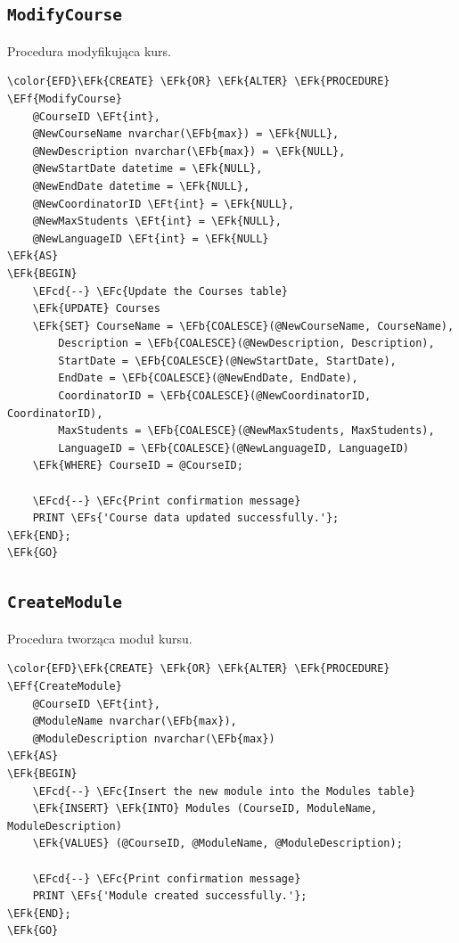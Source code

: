 \documentclass[11pt]{article}
\newcommand{\EFc}[1]{\textcolor{EFc}{\textit{#1}}} %
\newcommand{\EFcd}[1]{\textcolor{EFcd}{\textit{#1}}} %
\newcommand{\EFs}[1]{\textcolor{EFs}{#1}} %
\newcommand{\EFk}[1]{\textcolor{EFk}{\textbf{#1}}} %
\newcommand{\EFb}[1]{\textcolor{EFb}{\textbf{#1}}} %
\newcommand{\EFf}[1]{\textcolor{EFf}{#1}} %
\newcommand{\EFt}[1]{\textcolor{EFt}{\textbf{#1}}} %
\begin{document}
\subsection{\texttt{ModifyCourse}}
\label{sec:orgd56f8fb}
Procedura modyfikująca kurs.
\begin{Code}
\begin{Verbatim}
\color{EFD}\EFk{CREATE} \EFk{OR} \EFk{ALTER} \EFk{PROCEDURE} \EFf{ModifyCourse}
    @CourseID \EFt{int},
    @NewCourseName nvarchar(\EFb{max}) = \EFk{NULL},
    @NewDescription nvarchar(\EFb{max}) = \EFk{NULL},
    @NewStartDate datetime = \EFk{NULL},
    @NewEndDate datetime = \EFk{NULL},
    @NewCoordinatorID \EFt{int} = \EFk{NULL},
    @NewMaxStudents \EFt{int} = \EFk{NULL},
    @NewLanguageID \EFt{int} = \EFk{NULL}
\EFk{AS}
\EFk{BEGIN}
    \EFcd{--} \EFc{Update the Courses table}
    \EFk{UPDATE} Courses
    \EFk{SET} CourseName = \EFb{COALESCE}(@NewCourseName, CourseName),
        Description = \EFb{COALESCE}(@NewDescription, Description),
        StartDate = \EFb{COALESCE}(@NewStartDate, StartDate),
        EndDate = \EFb{COALESCE}(@NewEndDate, EndDate),
        CoordinatorID = \EFb{COALESCE}(@NewCoordinatorID, CoordinatorID),
        MaxStudents = \EFb{COALESCE}(@NewMaxStudents, MaxStudents),
        LanguageID = \EFb{COALESCE}(@NewLanguageID, LanguageID)
    \EFk{WHERE} CourseID = @CourseID;

    \EFcd{--} \EFc{Print confirmation message}
    PRINT \EFs{'Course data updated successfully.'};
\EFk{END};
\EFk{GO}
\end{Verbatim}
\end{Code}
\subsection{\texttt{CreateModule}}
\label{sec:orgdd61e27}
Procedura tworząca moduł kursu.
\begin{Code}
\begin{Verbatim}
\color{EFD}\EFk{CREATE} \EFk{OR} \EFk{ALTER} \EFk{PROCEDURE} \EFf{CreateModule}
    @CourseID \EFt{int},
    @ModuleName nvarchar(\EFb{max}),
    @ModuleDescription nvarchar(\EFb{max})
\EFk{AS}
\EFk{BEGIN}
    \EFcd{--} \EFc{Insert the new module into the Modules table}
    \EFk{INSERT} \EFk{INTO} Modules (CourseID, ModuleName, ModuleDescription)
    \EFk{VALUES} (@CourseID, @ModuleName, @ModuleDescription);

    \EFcd{--} \EFc{Print confirmation message}
    PRINT \EFs{'Module created successfully.'};
\EFk{END};
\EFk{GO}
\end{Verbatim}
\end{Code}
\end{document}
